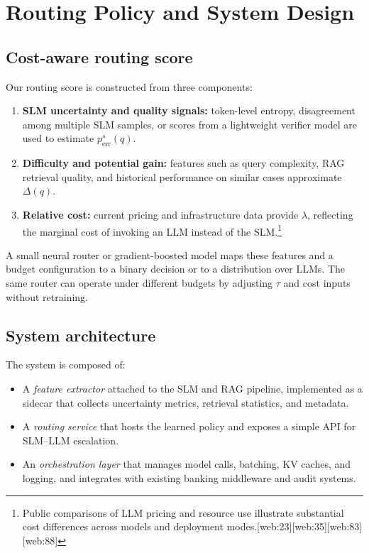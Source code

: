 \documentclass[11pt]{article}
\begin{document}
\section{Routing Policy and System Design}

\subsection{Cost-aware routing score}

Our routing score is constructed from three components:
\begin{enumerate}
    \item \textbf{SLM uncertainty and quality signals:} token-level entropy, disagreement among multiple SLM samples, or scores from a lightweight verifier model are used to estimate $p_{\text{err}}^s(q)$.
    \item \textbf{Difficulty and potential gain:} features such as query complexity, RAG retrieval quality, and historical performance on similar cases approximate $\Delta(q)$.
    \item \textbf{Relative cost:} current pricing and infrastructure data provide $\lambda$, reflecting the marginal cost of invoking an LLM instead of the SLM.\footnote{Public comparisons of LLM pricing and resource use illustrate substantial cost differences across models and deployment modes.[web:23][web:35][web:83][web:88]}
\end{enumerate}

A small neural router or gradient-boosted model maps these features and a budget configuration to a binary decision or to a distribution over LLMs. The same router can operate under different budgets by adjusting $\tau$ and cost inputs without retraining.

\subsection{System architecture}

The system is composed of:
\begin{itemize}
    \item A \emph{feature extractor} attached to the SLM and RAG pipeline, implemented as a sidecar that collects uncertainty metrics, retrieval statistics, and metadata.
    \item A \emph{routing service} that hosts the learned policy and exposes a simple API for SLM--LLM escalation.
    \item An \emph{orchestration layer} that manages model calls, batching, KV caches, and logging, and integrates with existing banking middleware and audit systems.
\end{itemize}
\end{document}
